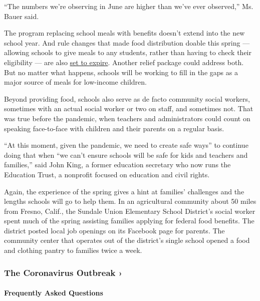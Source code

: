 ``The numbers we're observing in June are higher than we've ever
observed,'' Ms. Bauer said.

The program replacing school meals with benefits doesn't extend into the
new school year. And rule changes that made food distribution doable
this spring --- allowing schools to give meals to any students, rather
than having to check their eligibility --- are also
\href{https://www.politico.com/news/2020/07/20/millions-of-kids-may-lose-out-on-free-meals-as-they-return-to-school-374587}{set
to expire}. Another relief package could address both. But no matter
what happens, schools will be working to fill in the gaps as a major
source of meals for low-income children.

Beyond providing food, schools also serve as de facto community social
workers, sometimes with an actual social worker or two on staff, and
sometimes not. That was true before the pandemic, when teachers and
administrators could count on speaking face-to-face with children and
their parents on a regular basis.

``At this moment, given the pandemic, we need to create safe ways'' to
continue doing that when ``we can't ensure schools will be safe for kids
and teachers and families,'' said John King, a former education
secretary who now runs the Education Trust, a nonprofit focused on
education and civil rights.

Again, the experience of the spring gives a hint at families' challenges
and the lengths schools will go to help them. In an agricultural
community about 50 miles from Fresno, Calif., the Sundale Union
Elementary School District's social worker spent much of the spring
assisting families applying for federal food benefits. The district
posted local job openings on its Facebook page for parents. The
community center that operates out of the district's single school
opened a food and clothing pantry to families twice a week.

\href{https://www.nytimes3xbfgragh.onion/news-event/coronavirus?action=click\&pgtype=Article\&state=default\&region=MAIN_CONTENT_3\&context=storylines_faq}{}

\hypertarget{the-coronavirus-outbreak-}{%
\subsubsection{The Coronavirus Outbreak
›}\label{the-coronavirus-outbreak-}}

\hypertarget{frequently-asked-questions}{%
\paragraph{Frequently Asked
Questions}\label{frequently-asked-questions}}


